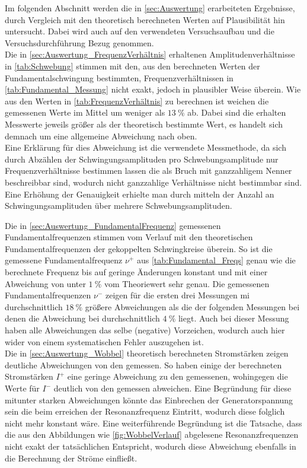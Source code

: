 Im folgenden Abschnitt werden die in \cref{sec:Auswertung} erarbeiteten Ergebnisse,
durch Vergleich mit den theoretisch berechneten Werten auf 
Plausibilität hin untersucht. Dabei wird auch auf den verwendeten Versuchsaufbau und die 
Versuchsdurchführung Bezug genommen.\\

Die in \cref{sec:Auswertung_FrequenzVerhältnis} erhaltenen Amplitudenverhältnisse in \cref{tab:Schwebung} 
stimmen mit den, aus den berechneten Werten der Fundamentalschwingung bestimmten, Frequenzverhältnissen
in \cref{tab:Fundamental_Messung} nicht exakt, jedoch in plausibler Weise überein. Wie aus den Werten in 
\cref{tab:FrequenzVerhältnis} zu berechnen ist weichen die gemessenen Werte im Mittel um weniger als
$\SI{13}{\percent}$ ab. Dabei sind die erhalten Messwerte jeweils größer als der theoretisch bestimmte 
Wert, es handelt sich demnach um eine allgemeine Abweichung nach oben.\\
Eine Erklärung für dies Abweichung ist die verwendete Messmethode, da sich durch Abzählen der Schwingungsamplituden
pro Schwebungsamplitude nur Frequenzverhältnisse bestimmen lassen die als Bruch mit ganzzahligem Nenner beschreibbar
sind, wodurch nicht ganzzahlige Verhältnisse nicht bestimmbar sind. Eine Erhöhung der Genauigkeit erhielte man durch 
mitteln der Anzahl an Schwingungsamplituden über mehrere Schwebungsamplituden.   
     
Die in \cref{sec:Auswertung_FundamentalFrequenz} gemessenen Fundamentalfrequenzen stimmen vom Verlauf mit den 
theoretischen Fundamentalfrequenzen der gekoppelten Schwingkreise überein. So ist die gemessene Fundamentalfrequenz
$\nu^{+}$  aus \cref{tab:Fundamental_Freqs} genau wie die berechnete Frequenz bis auf geringe Änderungen 
konstant und mit einer Abweichung von unter $\SI{1}{\percent}$ vom Theoriewert sehr genau. 
Die gemessenen Fundamentalfrequenzen $\nu^{-}$ zeigen für die ersten drei Messungen mi durchschnittlich $\SI{18}{\percent}$
größere Abweichungen als die der folgenden Messungen bei denen die Abweichung bei durchschnittlich $\SI{4}{\percent}$
liegt. Auch bei dieser Messung haben alle Abweichungen das selbe (negative) Vorzeichen, wodurch auch hier wider
von einem systematischen Fehler auszugehen ist.\\
Die in \cref{sec:Auswertung_Wobbel} theoretisch berechneten Stromstärken zeigen deutliche Abweichungen von den
gemessen. So haben einige der berechneten Stromstärken $I^{+}$ eine geringe Abweichung zu den gemessenen,
wohingegen die Werte für $I^{-}$ deutlich von den gemessen abweichen. Eine Begründung für diese mitunter
starken Abweichungen könnte das Einbrechen der Generatorspannung sein die beim erreichen der Resonanzfrequenz
Eintritt, wodurch diese folglich nicht mehr konstant wäre. Eine weiterführende Begründung ist die Tatsache, dass
die aus den Abbildungen wie \ref{fig:WobbelVerlauf} abgelesene Resonanzfrequenzen nicht exakt der 
tatsächlichen Entspricht, wodurch diese Abweichung ebenfalls in die Berechnung der Ströme einfließt. 
              